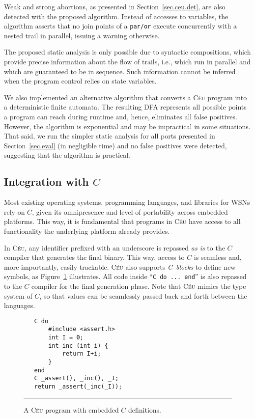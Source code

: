 \documentclass[10pt]{sensys-proc}
\newcommand{\CEU}{\textsc{C\'{e}u}\xspace}
\newcommand{\code}[1] {{\small{\texttt{#1}}}}
\begin{document}
Weak and strong abortions, as presented in Section~\ref{sec.ceu.det}, are also 
detected with the proposed algorithm.
Instead of accesses to variables, the algorithm asserts that no join points of 
a \code{par/or} execute concurrently with a nested trail in parallel, issuing a 
warning otherwise.

The proposed static analysis is only possible due to syntactic compositions, 
which provide precise information about the flow of trails, i.e., which run in 
parallel and which are guaranteed to be in sequence.
Such information cannot be inferred when the program control relies on state 
variables.

We also implemented an alternative algorithm that converts a \CEU program into 
a deterministic finite automata.
The resulting DFA represents all possible points a program can reach during 
runtime and, hence, eliminates all false positives.
However, the algorithm is exponential and may be impractical in some 
situations.
%
That said, we run the simpler static analysis for all ports presented in 
Section~\ref{sec.eval} (in negligible time) and no false positives were 
detected, suggesting that the algorithm is practical.

\subsection{Integration with $C$}
\label{sec.ceu.c}

Most existing operating systems, programming languages, and libraries for WSNs 
rely on $C$, given its omnipresence and level of portability across embedded 
platforms.
This way, it is fundamental that programs in \CEU have access to all 
functionality the underlying platform already provides.

In \CEU, any identifier prefixed with an underscore is repassed \emph{as is} to 
the $C$ compiler that generates the final binary.
This way, access to $C$ is seamless and, more importantly, easily trackable.
%
\CEU also supports \emph{C~blocks} to define new symbols, as Figure~\ref{lst.c} 
illustrates.
All code inside ``\code{C do ... end}'' is also repassed to the $C$ compiler 
for the final generation phase.
Note that \CEU{} mimics the type system of $C$, so that values can be 
seamlessly passed back and forth between the languages.

\begin{figure}[t]
{\small
\begin{verbatim}
   C do
       #include <assert.h>
       int I = 0;
       int inc (int i) {
           return I+i;
       }
   end
   C _assert(), _inc(), _I;
   return _assert(_inc(_I));
\end{verbatim}
}
\rule{8.5cm}{0.37pt}
\caption{ A \CEU program with embedded $C$ definitions.
\label{lst.c}
}
\end{figure}
\end{document}
